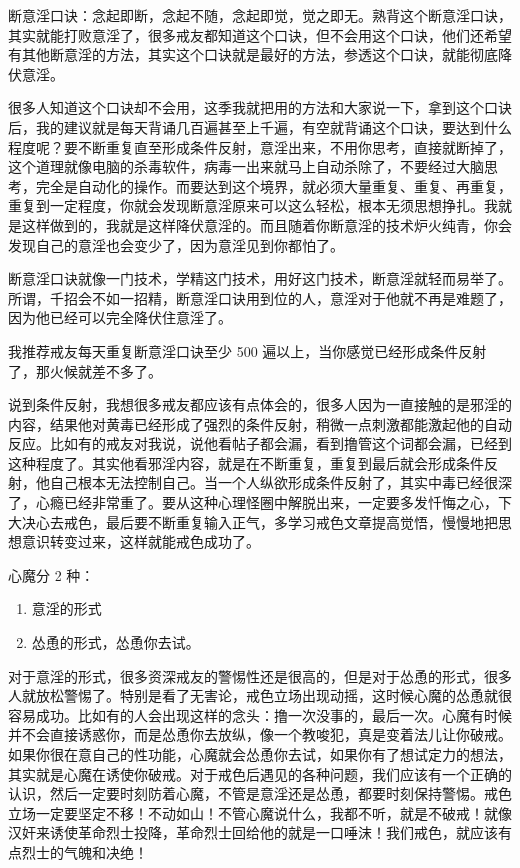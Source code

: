 \documentclass{ctexart}
\begin{document}
断意淫口诀：念起即断，念起不随，念起即觉，觉之即无。熟背这个断意淫口诀，其实就能打败意淫了，很多戒友都知道这个口诀，但不会用这个口诀，他们还希望有其他断意淫的方法，其实这个口诀就是最好的方法，参透这个口诀，就能彻底降伏意淫。

很多人知道这个口诀却不会用，这季我就把用的方法和大家说一下，拿到这个口诀后，我的建议就是每天背诵几百遍甚至上千遍，有空就背诵这个口诀，要达到什么程度呢？要不断重复直至形成条件反射，意淫出来，不用你思考，直接就断掉了，这个道理就像电脑的杀毒软件，病毒一出来就马上自动杀除了，不要经过大脑思考，完全是自动化的操作。而要达到这个境界，就必须大量重复、重复、再重复，重复到一定程度，你就会发现断意淫原来可以这么轻松，根本无须思想挣扎。我就是这样做到的，我就是这样降伏意淫的。而且随着你断意淫的技术炉火纯青，你会发现自己的意淫也会变少了，因为意淫见到你都怕了。

断意淫口诀就像一门技术，学精这门技术，用好这门技术，断意淫就轻而易举了。所谓，千招会不如一招精，断意淫口诀用到位的人，意淫对于他就不再是难题了，因为他已经可以完全降伏住意淫了。

我推荐戒友每天重复断意淫口诀至少 500 遍以上，当你感觉已经形成条件反射了，那火候就差不多了。

说到条件反射，我想很多戒友都应该有点体会的，很多人因为一直接触的是邪淫的内容，结果他对黄毒已经形成了强烈的条件反射，稍微一点刺激都能激起他的自动反应。比如有的戒友对我说，说他看帖子都会漏，看到撸管这个词都会漏，已经到这种程度了。其实他看邪淫内容，就是在不断重复，重复到最后就会形成条件反射，他自己根本无法控制自己。当一个人纵欲形成条件反射了，其实中毒已经很深了，心瘾已经非常重了。要从这种心理怪圈中解脱出来，一定要多发忏悔之心，下大决心去戒色，最后要不断重复输入正气，多学习戒色文章提高觉悟，慢慢地把思想意识转变过来，这样就能戒色成功了。

心魔分 2 种：

\begin{enumerate}
    \item 意淫的形式
    \item 怂恿的形式，怂恿你去试。
\end{enumerate}

对于意淫的形式，很多资深戒友的警惕性还是很高的，但是对于怂恿的形式，很多人就放松警惕了。特别是看了无害论，戒色立场出现动摇，这时候心魔的怂恿就很容易成功。比如有的人会出现这样的念头：撸一次没事的，最后一次。心魔有时候并不会直接诱惑你，而是怂恿你去放纵，像一个教唆犯，真是变着法儿让你破戒。如果你很在意自己的性功能，心魔就会怂恿你去试，如果你有了想试定力的想法，其实就是心魔在诱使你破戒。对于戒色后遇见的各种问题，我们应该有一个正确的认识，然后一定要时刻防着心魔，不管是意淫还是怂恿，都要时刻保持警惕。戒色立场一定要坚定不移！不动如山！不管心魔说什么，我都不听，就是不破戒！就像汉奸来诱使革命烈士投降，革命烈士回给他的就是一口唾沫！我们戒色，就应该有点烈士的气魄和决绝！
\end{document}
